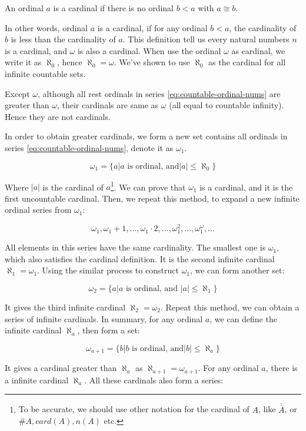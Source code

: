 \documentclass{article}
\begin{document}
\begin{definition}
An ordinal $a$ is a cardinal if there is no ordinal $b < a$ with $ a \cong b$.
\end{definition}

In other words, ordinal $a$ is a cardinal, if for any ordinal $b < a$, the cardinality of $b$ is less than the cardinality of $a$. This definition tell us every natural numbers $n$ is a cardinal, and $\omega$ is also a cardinal. When use the ordinal $\omega$ as cardinal, we write it as $\aleph_0$, hence $\aleph_0 = \omega$. We've shown to use $\aleph_0$ as the cardinal for all infinite countable sets.

Except $\omega$, although all rest ordinals in series \ref{eq:countable-ordinal-nums} are greater than $\omega$, their cardinals are same as $\omega$ (all equal to countable infinity). Hence they are not cardinals.

In order to obtain greater cardinals, we form a new set contains all ordinals in series \ref{eq:countable-ordinal-nums}, denote it as $\omega_1$.

\[
\omega_1 = \{ a | a \text{ is ordinal, and} |a| \leq \aleph_0\}
\]

Where $|a|$ is the cardinal of $a$\footnote{To be accurate, we should use other notation for the cardinal of $A$, like $\overline{\overline{A}}$, or $\#A, card(A), n(A)$ etc.}. We can prove that $\omega_1$ is a cardinal, and it is the first uncountable cardinal. Then, we repeat this method, to expand a new infinite ordinal series from $\omega_1$:

\[
\omega_1, \omega_1 + 1, ..., \omega_1 \cdot 2, ..., \omega_1^2, ..., \omega_1^\omega, ...
\]

All elements in this series have the same cardinality. The smallest one is $\omega_1$, which also satisfies the cardinal definition. It is the second infinite cardinal $\aleph_1 = \omega_1$. Using the similar process to construct $\omega_1$, we can form another set:

\[
\omega_2 = \{ a | a \text{ is ordinal, and } |a| \leq \aleph_1\}
\]

It gives the third infinite cardinal $\aleph_2 = \omega_2$. Repeat this method, we can obtain a series of infinite cardinals. In summary, for any ordinal $a$, we can define the infinite cardinal $\aleph_a$, then form a set:

\[
\omega_{a+1} = \{ b | b \text{ is ordinal, and} |b| \leq \aleph_a\}
\]

It gives a cardinal greater than $\aleph_a$ as $\aleph_{a+1} = \omega_{a+1}$. For any ordinal $a$, there is a infinite cardinal $\aleph_a$. All these cardinals also form a series:
\end{document}
